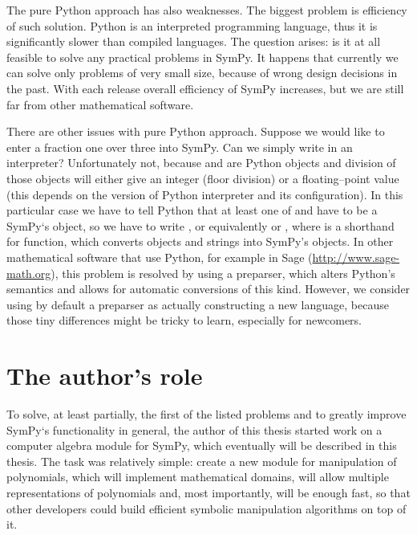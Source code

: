 The pure Python approach has also weaknesses. The biggest problem is efficiency of such
solution. Python is an interpreted programming language, thus it is significantly slower
than compiled languages. The question arises: is it at all feasible to solve any practical
problems in SymPy. It happens that currently we can solve only problems of very small
size, because of wrong design decisions in the past. With each release overall efficiency
of SymPy increases, but we are still far from other mathematical software.

There are other issues with pure Python approach. Suppose we would like to enter a fraction
one over three into SymPy. Can we simply write  in an interpreter? Unfortunately
not, because  and  are Python objects and division of those objects will either
give an integer (floor division) or a floating--point value (this depends on the version
of Python interpreter and its configuration). In this particular case we have to tell Python
that at least one of  and  have to be a SymPy`s object, so we have to write
, or equivalently  or , where  is a shorthand
for  function, which converts objects and strings into SymPy's objects. In
other mathematical software that use Python, for example in Sage (\href{http://www.sage-math.org}{http://www.sage-math.org}),
this problem is resolved by using a preparser, which alters Python's semantics and allows
for automatic conversions of this kind. However, we consider using by default a preparser
as actually constructing a new language, because those tiny differences might be tricky
to learn, especially for newcomers.


\section{The author's role}

To solve, at least partially, the first of the listed problems and to greatly improve
SymPy`s functionality in general, the author of this thesis started work on a computer
algebra module for SymPy, which eventually will be described in this thesis. The task
was relatively simple: create a new module for manipulation of polynomials, which will
implement mathematical domains, will allow multiple representations of polynomials and,
most importantly, will be enough fast, so that other developers could build efficient
symbolic manipulation algorithms on top of it.

